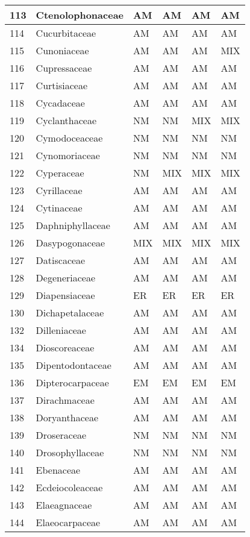 \documentclass[]{article}
\begin{document}
\begin{longtable}{l|l|l|l|l|l}
\hline
113 & Ctenolophonaceae & AM & AM & AM & AM\\
\hline
114 & Cucurbitaceae & AM & AM & AM & AM\\
\hline
115 & Cunoniaceae & AM & AM & AM & MIX\\
\hline
116 & Cupressaceae & AM & AM & AM & AM\\
\hline
117 & Curtisiaceae & AM & AM & AM & AM\\
\hline
118 & Cycadaceae & AM & AM & AM & AM\\
\hline
119 & Cyclanthaceae & NM & NM & MIX & MIX\\
\hline
120 & Cymodoceaceae & NM & NM & NM & NM\\
\hline
121 & Cynomoriaceae & NM & NM & NM & NM\\
\hline
122 & Cyperaceae & NM & MIX & MIX & MIX\\
\hline
123 & Cyrillaceae & AM & AM & AM & AM\\
\hline
124 & Cytinaceae & AM & AM & AM & AM\\
\hline
125 & Daphniphyllaceae & AM & AM & AM & AM\\
\hline
126 & Dasypogonaceae & MIX & MIX & MIX & MIX\\
\hline
127 & Datiscaceae & AM & AM & AM & AM\\
\hline
128 & Degeneriaceae & AM & AM & AM & AM\\
\hline
129 & Diapensiaceae & ER & ER & ER & ER\\
\hline
130 & Dichapetalaceae & AM & AM & AM & AM\\
\hline
132 & Dilleniaceae & AM & AM & AM & AM\\
\hline
134 & Dioscoreaceae & AM & AM & AM & AM\\
\hline
135 & Dipentodontaceae & AM & AM & AM & AM\\
\hline
136 & Dipterocarpaceae & EM & EM & EM & EM\\
\hline
137 & Dirachmaceae & AM & AM & AM & AM\\
\hline
138 & Doryanthaceae & AM & AM & AM & AM\\
\hline
139 & Droseraceae & NM & NM & NM & NM\\
\hline
140 & Drosophyllaceae & NM & NM & NM & NM\\
\hline
141 & Ebenaceae & AM & AM & AM & AM\\
\hline
142 & Ecdeiocoleaceae & AM & AM & AM & AM\\
\hline
143 & Elaeagnaceae & AM & AM & AM & AM\\
\hline
144 & Elaeocarpaceae & AM & AM & AM & AM\\

\end{longtable}
\end{document}
